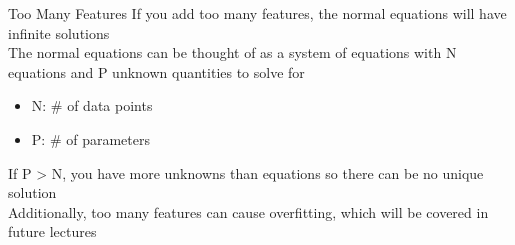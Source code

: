 \documentclass[aspectratio=169]{../latex_main/tntbeamer}  %
\begin{document}
	
	
	\begin{frame}{Too Many Features}
	    If you add too many features, the normal equations will have infinite solutions\\
	    \bigskip
        The normal equations can be thought of as a system of equations with N equations and P unknown quantities to solve for
	    \begin{itemize}
	        \item N: \# of data points
	        \item P: \# of parameters
	    \end{itemize}
	    \bigskip
	    If P > N, you have more unknowns than equations so there can be no unique solution\\
	    \bigskip
	    Additionally, too many features can cause overfitting, which will be covered in future lectures
	\end{frame}
\end{document}
